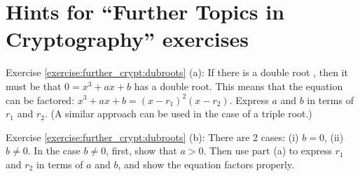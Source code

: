 \section{Hints for ``Further  Topics in Cryptography'' exercises}
\label{sec:FurtherCryptography:Hints}

\noindent Exercise \ref{exercise:further_crypt:dubroots} (a):  If there is a double root , then it must be that $0 = x^3 + ax + b$ has a double root. This means that the equation can be factored:  $x^3 + ax+b = (x-r_1)^2(x-r_2)$.  Express $a$ and $b$ in terms of $r_1$ and $r_2$.  (A similar approach can be used in the case of a triple root.)  

\noindent Exercise \ref{exercise:further_crypt:dubroots} (b):  There are 2 cases: (i) $b=0$, (ii) $b \neq 0$. In the case $b \neq 0$, first, show that $a > 0$.  Then use part (a) to express $r_1$ and $r_2$ in terms of $a$ and $b$, and show the equation factors properly.

